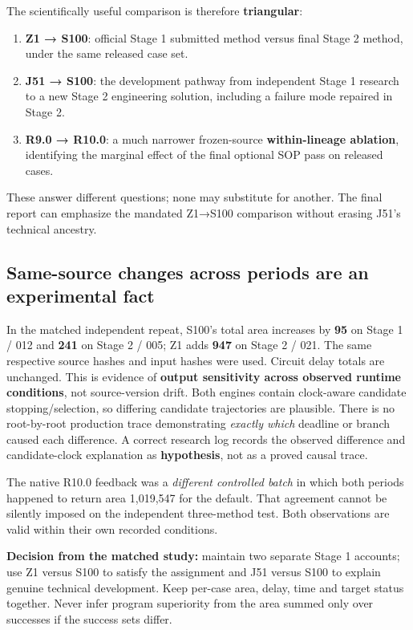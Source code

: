 The scientifically useful comparison is therefore \textbf{triangular}:

\begin{enumerate}
\def\labelenumi{\arabic{enumi}.}
\tightlist
\item
  \textbf{Z1 → S100}: official Stage 1 submitted method versus final Stage 2 method, under the same released case set.
\item
  \textbf{J51 → S100}: the development pathway from independent Stage 1 research to a new Stage 2 engineering solution, including a failure mode repaired in Stage 2.
\item
  \textbf{R9.0 → R10.0}: a much narrower frozen-source \textbf{within-lineage ablation}, identifying the marginal effect of the final optional SOP pass on released cases.
\end{enumerate}

These answer different questions; none may substitute for another. The final report can emphasize the mandated Z1→S100 comparison without erasing J51's technical ancestry.

\subsection{Same-source changes across periods are an experimental fact}\label{same-source-changes-across-periods-are-an-experimental-fact}

In the matched independent repeat, S100's total area increases by \textbf{95} on Stage 1 / 012 and \textbf{241} on Stage 2 / 005; Z1 adds \textbf{947} on Stage 2 / 021. The same respective source hashes and input hashes were used. Circuit delay totals are unchanged. This is evidence of \textbf{output sensitivity across observed runtime conditions}, not source-version drift. Both engines contain clock-aware candidate stopping/selection, so differing candidate trajectories are plausible. There is no root-by-root production trace demonstrating \emph{exactly which} deadline or branch caused each difference. A correct research log records the observed difference and candidate-clock explanation as \textbf{hypothesis}, not as a proved causal trace.

The native R10.0 feedback was a \emph{different controlled batch} in which both periods happened to return area 1,019,547 for the default. That agreement cannot be silently imposed on the independent three-method test. Both observations are valid within their own recorded conditions.

\begin{tcolorbox}[colback=ResearchBlue!6!white,colframe=ResearchSlate!55!white,boxrule=0.65pt,arc=1mm,breakable]
\textbf{Decision from the matched study:} maintain two separate Stage 1 accounts; use Z1 versus S100 to satisfy the assignment and J51 versus S100 to explain genuine technical development. Keep per-case area, delay, time and target status together. Never infer program superiority from the area summed only over successes if the success sets differ.
\end{tcolorbox}

